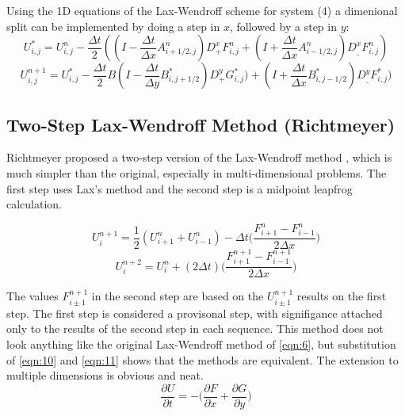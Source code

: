 Using the 1D equations of the Lax-Wendroff scheme for system (4) a dimenional split can be implemented by 
doing a step in $x$, followed by a step in $y$: 
\begin{equation}\label{eqn:6}
U_{i,j}^* = U_{i,j}^n - \frac{\Delta t}{2} (( I- \frac{\Delta t}{\Delta x} A_{i+1/2,j}^n ) D_+^xF_{i,j}^n + (I+ \frac{\Delta
t}{\Delta x} A_{i-1/2,j}^n) D_{\_}^xF_{i,j}^n)
\end{equation}
\begin{equation}\label{eqn:7}
U_{i,j}^{n+1} = U_{i,j}^* - \frac{\Delta t}{2} B(I - \frac{\Delta t}{\Delta y} B_{i,j+1/2}^*) D_+^yG_{i,j}^*) +(I + \frac{\Delta
t}{\Delta x} B_{i,j-1/2}^* ) D_{\_}^y F_{i,j}^* )
\end{equation}
\newline


\subsection{Two-Step Lax-Wendroff Method (Richtmeyer)}

Richtmeyer proposed a two-step version of the Lax-Wendroff method \cite{Roach}, which is much simpler than the original, especially in multi-dimensional problems.
The first step uses Lax's  method and the second step is a midpoint leapfrog calculation. 

\begin{equation}\label{eqn:8}
U_{i}^{n+1} = \frac{1}{2}(U_{i+1}^{n}+U_{i-1}^{n})-\Delta{t} \Big(\frac{F_{i+1}^{n}-F_{i-1}^{n}}{2\Delta x}\Big)
\end{equation}
\begin{equation}\label{eqn:9}
U_{i}^{n+2} = U_{i}^{n} + (2\Delta t) \Big ( \frac{ F_{i+1}^{n+1}-F_{i-1}^{n+1} }{ 2 \Delta x } \Big)
\end{equation} 
\newline

The values $F_{i \pm 1}^{n+1}$ in the second step are based on the $U_{i \pm 1}^{n+1}$ results on the first step. The first step is considered
a provisonal step, with signifigance attached only to the results of the second step in each sequence. This method does not look anything like the original
Lax-Wendroff method of \eqref{eqn:6}, but substitution of \eqref{eqn:10} and \eqref{eqn:11} shows that the methods are equivalent. 
\newline
The extension to multiple dimensions is obvious and neat.
\begin{equation}\label{eqn:10}
\frac{\partial U}{\partial t} = - \Big( \frac{\partial F}{\partial x} + \frac{\partial G}{\partial y} \Big)
\end{equation}

